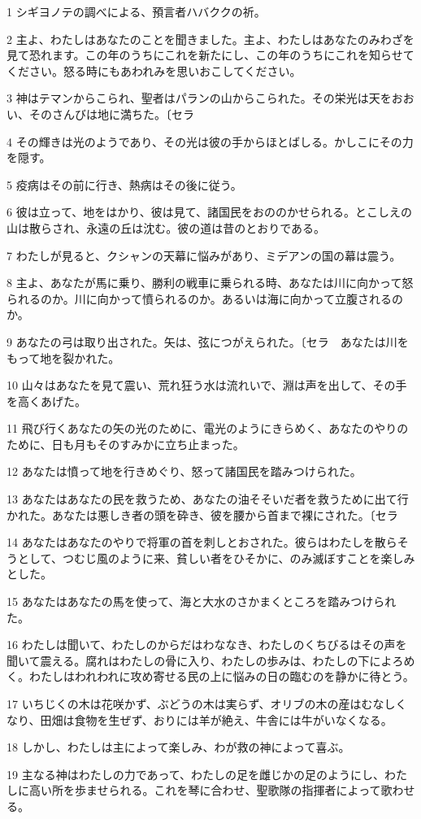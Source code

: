 \par 1 シギヨノテの調べによる、預言者ハバククの祈。
\par 2 主よ、わたしはあなたのことを聞きました。主よ、わたしはあなたのみわざを見て恐れます。この年のうちにこれを新たにし、この年のうちにこれを知らせてください。怒る時にもあわれみを思いおこしてください。
\par 3 神はテマンからこられ、聖者はパランの山からこられた。その栄光は天をおおい、そのさんびは地に満ちた。〔セラ
\par 4 その輝きは光のようであり、その光は彼の手からほとばしる。かしこにその力を隠す。
\par 5 疫病はその前に行き、熱病はその後に従う。
\par 6 彼は立って、地をはかり、彼は見て、諸国民をおののかせられる。とこしえの山は散らされ、永遠の丘は沈む。彼の道は昔のとおりである。
\par 7 わたしが見ると、クシャンの天幕に悩みがあり、ミデアンの国の幕は震う。
\par 8 主よ、あなたが馬に乗り、勝利の戦車に乗られる時、あなたは川に向かって怒られるのか。川に向かって憤られるのか。あるいは海に向かって立腹されるのか。
\par 9 あなたの弓は取り出された。矢は、弦につがえられた。〔セラ　あなたは川をもって地を裂かれた。
\par 10 山々はあなたを見て震い、荒れ狂う水は流れいで、淵は声を出して、その手を高くあげた。
\par 11 飛び行くあなたの矢の光のために、電光のようにきらめく、あなたのやりのために、日も月もそのすみかに立ち止まった。
\par 12 あなたは憤って地を行きめぐり、怒って諸国民を踏みつけられた。
\par 13 あなたはあなたの民を救うため、あなたの油そそいだ者を救うために出て行かれた。あなたは悪しき者の頭を砕き、彼を腰から首まで裸にされた。〔セラ
\par 14 あなたはあなたのやりで将軍の首を刺しとおされた。彼らはわたしを散らそうとして、つむじ風のように来、貧しい者をひそかに、のみ滅ぼすことを楽しみとした。
\par 15 あなたはあなたの馬を使って、海と大水のさかまくところを踏みつけられた。
\par 16 わたしは聞いて、わたしのからだはわななき、わたしのくちびるはその声を聞いて震える。腐れはわたしの骨に入り、わたしの歩みは、わたしの下によろめく。わたしはわれわれに攻め寄せる民の上に悩みの日の臨むのを静かに待とう。
\par 17 いちじくの木は花咲かず、ぶどうの木は実らず、オリブの木の産はむなしくなり、田畑は食物を生ぜず、おりには羊が絶え、牛舎には牛がいなくなる。
\par 18 しかし、わたしは主によって楽しみ、わが救の神によって喜ぶ。
\par 19 主なる神はわたしの力であって、わたしの足を雌じかの足のようにし、わたしに高い所を歩ませられる。これを琴に合わせ、聖歌隊の指揮者によって歌わせる。


